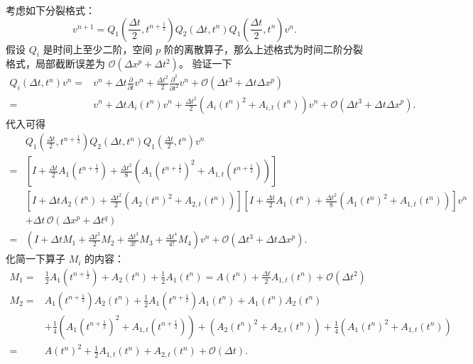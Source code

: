考虑如下分裂格式：
\[
    v^{n+1} = Q_1(\frac{\Delta t}2,t^{n+\frac12}) Q_2(\Delta t,t^n) Q_1(\frac{\Delta t}2,t^n) v^n.
\]
假设 $Q_i$ 是时间上至少二阶，空间 $p$ 阶的离散算子，那么上述格式为时间二阶分裂格式，局部截断误差为 $\mathcal{O}(\Delta x^p + \Delta t^2)$。
验证一下
\begin{align*}
    Q_i(\Delta t,t^n)v^n
    ={} & v^n
    + \Delta t \frac{\partial}{\partial t}v^n
    + \frac{\Delta t^2}2 \frac{\partial^2}{\partial t^2}v^n
    + \mathcal{O}(\Delta t^3 + \Delta t \Delta x^p) \\
    ={} & v^n
    + \Delta t A_i(t^n) v^n
    + \frac{\Delta t^2}2 \left(A_i(t^n)^2+ A_{i,t}(t^n) \right)v^n
    + \mathcal{O}(\Delta t^3 + \Delta t \Delta x^p).
\end{align*}
代入可得
\begin{align*}
        & Q_1(\frac{\Delta t}2,t^{n+\frac12}) Q_2(\Delta t,t^n) Q_1(\frac{\Delta t}2,t^n) v^n                                                                              \\
    ={} &
    \left[I
    + \frac{\Delta t}2 A_1(t^{n+\frac12})
    + \frac{\Delta t^2}8 \left(A_1(t^{n+\frac12})^2+A_{1,t}(t^{n+\frac12})\right)
    \right]                                                                                                                                                                \\
        & \left[I
    + \Delta t  A_2(t^{n})
    + \frac{\Delta t^2}2 \left(A_2(t^{n})^2+A_{2,t}(t^{n})\right)
    \right] \left[I
        + \frac{\Delta t}2 A_1(t^{n})
        + \frac{\Delta t^2}8 \left(A_1(t^{n})^2+ A_{1,t}(t^{n}) \right)
    \right] v^n                                                                                                                                                            \\
        & + \Delta t \,\mathcal{O}(\Delta x^p + \Delta t^q)
    \\
    ={} & \left(I+\Delta t M_1 + \frac{\Delta t^2}2 M_2 + \frac{\Delta t^3}{3!} M_3 + \frac{\Delta t^4}{4!} M_4\right) v^n + \mathcal{O}(\Delta t^3 + \Delta t \Delta x^p).
\end{align*}
化简一下算子 $M_i$ 的内容：
\begin{align*}
    M_1 ={} & \frac12 A_1(t^{n+\frac12}) + A_2(t^n) + \frac12 A_1(t^n) = A(t^n) + \frac{\Delta t}2 A_{1,t}(t^{n}) + \mathcal{O}(\Delta t^2) \\
    M_2 ={} &
    A_1(t^{n+\frac12}) A_2(t^{n}) + \frac12 A_1(t^{n+\frac12}) A_1(t^{n})
    + A_1(t^{n}) A_2(t^{n})                                                                                                                 \\
            & + \frac14 \left(A_1(t^{n+\frac12})^2+A_{1,t}(t^{n+\frac12})\right) +
    \left(A_2(t^{n})^2+A_{2,t}(t^{n})\right) +
    \frac14 \left(A_1(t^{n})^2+A_{1,t}(t^{n})\right)                                                                                        \\
    ={}     & A(t^n)^2 + \frac12 A_{1,t}(t^n) + A_{2,t}(t^n) + \mathcal{O}(\Delta t).
\end{align*}
